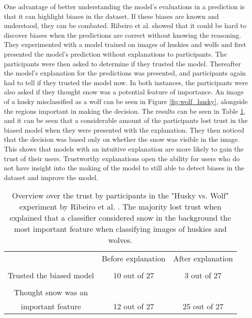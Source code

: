 One advantage of better understanding the model's evaluations in a prediction is that it can highlight biases in the dataset. If these biases are known and understood, they can be combated. Ribeiro et al. \cite{ribeiroWhyShouldTrust2016} showed that it could be hard to discover biases when the predictions are correct without knowing the reasoning. They experimented with a model trained on images of huskies and wolfs and first presented the model's prediction without explanations to participants. The participants were then asked to determine if they trusted the model. Thereafter the model's explanation for the predictions was presented, and participants again had to tell if they trusted the model now. In both instances, the participants were also asked if they thought snow was a potential feature of importance. An image of a husky misclassified as a wolf can be seen in Figure \ref{fig:wolf_husky}, alongside the regions important in making the decision. The results can be seen in Table \ref{table:husky_vs_wolf}, and it can be seen that a considerable amount of the participants lost trust in the biased model when they were presented with the explanation. They then noticed that the decision was based only on whether the snow was visible in the image. This shows that models with an intuitive explanation are more likely to gain the trust of their users. Trustworthy explanations open the ability for users who do not have insight into the making of the model to still able to detect biases in the dataset and improve the model. 

\begin{table}[htb]
    \centering
    \begin{tabular}{ c c c} 
     
               & Before explanation & After explanation\\ [0.5ex] 
        \Xhline{1.5pt} \\ 
            Trusted the biased model & 10 out of 27 & 3 out of 27 \\  [0.5ex]
        \hline  \\ 
            Thought snow was an \\ important feature & 12 out of 27 & 25 out of 27 \\ [1ex] 
        \hline
    \end{tabular}
    \caption[Overview over the trust by participants in the "Husky vs. Wolf" experiment by Ribeiro et al. \cite{ribeiroWhyShouldTrust2016}.]{Overview over the trust by participants in the "Husky vs. Wolf" experiment by Ribeiro et al. \cite{ribeiroWhyShouldTrust2016}. The majority lost trust when explained that a classifier considered snow in the background the most important feature when classifying images of huskies and wolves.}
    \label{table:husky_vs_wolf}
\end{table}

